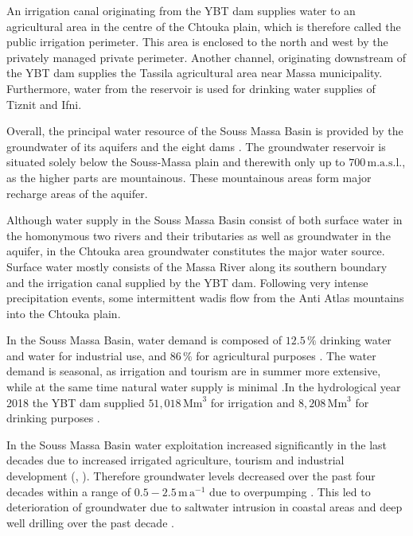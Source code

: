 An irrigation canal originating from the YBT dam supplies water to an agricultural area in the centre of the Chtouka plain, which is therefore called the public irrigation perimeter. This area is enclosed to the north and west by the privately managed private perimeter. Another channel, originating downstream of the YBT dam supplies the Tassila agricultural area near Massa municipality. Furthermore, water from the reservoir is used for drinking water supplies of Tiznit and Ifni.

Overall, the principal water resource of the Souss Massa Basin is provided by the groundwater of its aquifers and the eight dams \parencite{Hssaisoune.2017}. The groundwater reservoir is situated solely below the Souss-Massa plain and therewith only up to $700 \, \textrm{m.a.s.l.}$, as the higher parts are mountainous. These mountainous areas form major recharge areas of the aquifer.

Although water supply in the Souss Massa Basin consist of both surface water in the homonymous two rivers and their tributaries as well as groundwater in the aquifer, in the Chtouka area groundwater constitutes the major water source. Surface water mostly consists of the Massa River along its southern boundary and the irrigation canal supplied by the YBT dam. Following very intense precipitation events, some intermittent wadis flow from the Anti Atlas mountains into the Chtouka plain.

In the Souss Massa Basin, water demand is composed of $12.5 \, \%$ drinking water and water for industrial use, and $86 \, \%$ for agricultural purposes \parencite{Choukr.2017}. The water demand is seasonal, as irrigation and tourism are in summer more extensive, while at the same time natural water supply is minimal \parencite{Choukr.2017}.In the hydrological year 2018 the YBT dam supplied $51,018 \, \textrm{Mm}^3$ for irrigation and $8,208 \, \textrm{Mm}^3$ for drinking purposes \parencite{ABHSMD-HydStats.2022}.

In the Souss Massa Basin water exploitation increased significantly in the last decades due to increased irrigated agriculture, tourism and industrial development (\textcite{Choukr.2017}, \textcite{Hssaisoune.2017}). Therefore groundwater levels decreased over the past four decades within a range of $0.5 - 2.5 \, \textrm{m}\, \textrm{a}^{-1}$ due to overpumping \parencite{Choukr.2017} \parencite{Hssaisoune.2017}. This led to deterioration of groundwater due to saltwater intrusion in coastal areas and deep well drilling over the past decade \parencite{Choukr.2017}.

